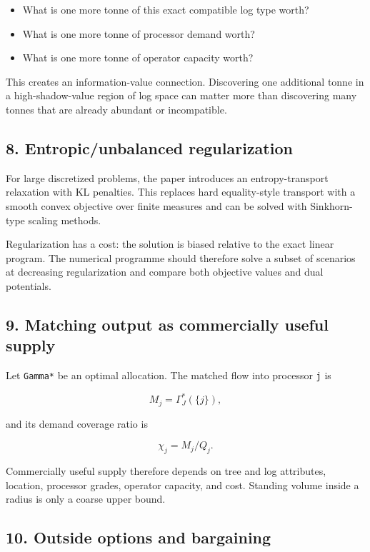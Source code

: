 \begin{itemize}
\tightlist
\item
  What is one more tonne of this exact compatible log type worth?
\item
  What is one more tonne of processor demand worth?
\item
  What is one more tonne of operator capacity worth?
\end{itemize}

This creates an information-value connection. Discovering one additional tonne
in a high-shadow-value region of log space can matter more than discovering many
tonnes that are already abundant or incompatible.

\subsection{8. Entropic/unbalanced regularization}\label{entropicunbalanced-regularization}

For large discretized problems, the paper introduces an entropy-transport
relaxation with KL penalties. This replaces hard equality-style transport with a
smooth convex objective over finite measures and can be solved with
Sinkhorn-type scaling methods.

Regularization has a cost: the solution is biased relative to the exact linear
program. The numerical programme should therefore solve a subset of scenarios
at decreasing regularization and compare both objective values and dual
potentials.

\subsection{9. Matching output as commercially useful supply}\label{matching-output-as-commercially-useful-supply}

Let \texttt{Gamma*} be an optimal allocation. The matched flow into processor \texttt{j} is

\[
M_j=\Gamma_J^*(\{j\}),
\]

and its demand coverage ratio is

\[
\chi_j=M_j/Q_j.
\]

Commercially useful supply therefore depends on tree and log attributes,
location, processor grades, operator capacity, and cost. Standing volume inside a
radius is only a coarse upper bound.

\subsection{10. Outside options and bargaining}\label{outside-options-and-bargaining}

